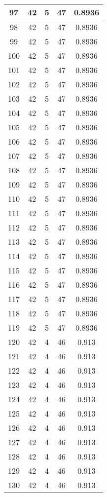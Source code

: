 \documentclass[letterpaper, 12pt]{article}
\begin{document}
\begin{longtable}{|c|c|c|c|c|}
\hline
97 & 42 & 5 & 47 & 0.8936 \\
\hline
98 & 42 & 5 & 47 & 0.8936 \\
\hline
99 & 42 & 5 & 47 & 0.8936 \\
\hline
100 & 42 & 5 & 47 & 0.8936 \\
\hline
101 & 42 & 5 & 47 & 0.8936 \\
\hline
102 & 42 & 5 & 47 & 0.8936 \\
\hline
103 & 42 & 5 & 47 & 0.8936 \\
\hline
104 & 42 & 5 & 47 & 0.8936 \\
\hline
105 & 42 & 5 & 47 & 0.8936 \\
\hline
106 & 42 & 5 & 47 & 0.8936 \\
\hline
107 & 42 & 5 & 47 & 0.8936 \\
\hline
108 & 42 & 5 & 47 & 0.8936 \\
\hline
109 & 42 & 5 & 47 & 0.8936 \\
\hline
110 & 42 & 5 & 47 & 0.8936 \\
\hline
111 & 42 & 5 & 47 & 0.8936 \\
\hline
112 & 42 & 5 & 47 & 0.8936 \\
\hline
113 & 42 & 5 & 47 & 0.8936 \\
\hline
114 & 42 & 5 & 47 & 0.8936 \\
\hline
115 & 42 & 5 & 47 & 0.8936 \\
\hline
116 & 42 & 5 & 47 & 0.8936 \\
\hline
117 & 42 & 5 & 47 & 0.8936 \\
\hline
118 & 42 & 5 & 47 & 0.8936 \\
\hline
119 & 42 & 5 & 47 & 0.8936 \\
\hline
120 & 42 & 4 & 46 & 0.913 \\
\hline
121 & 42 & 4 & 46 & 0.913 \\
\hline
122 & 42 & 4 & 46 & 0.913 \\
\hline
123 & 42 & 4 & 46 & 0.913 \\
\hline
124 & 42 & 4 & 46 & 0.913 \\
\hline
125 & 42 & 4 & 46 & 0.913 \\
\hline
126 & 42 & 4 & 46 & 0.913 \\
\hline
127 & 42 & 4 & 46 & 0.913 \\
\hline
128 & 42 & 4 & 46 & 0.913 \\
\hline
129 & 42 & 4 & 46 & 0.913 \\
\hline
130 & 42 & 4 & 46 & 0.913 \\

\end{longtable}
\end{document}
